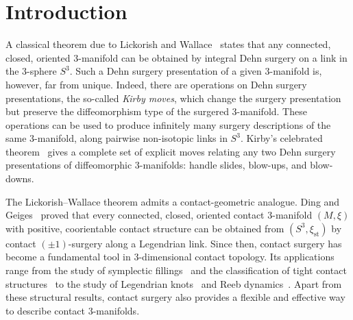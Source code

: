 \documentclass{amsart}
\numberwithin{equation}{section}
\numberwithin{figure}{section}
\theoremstyle{definition}
\theoremstyle{remark}
\let\olddxi\xi %
\renewcommand{\xi}{\olddxi}
\newcommand{\xist}{\olddxi_{\mathrm{st}}}
\begin{document}
\section{Introduction}
A classical theorem due to Lickorish and Wallace~\cite{Lickorish,Wallace} states that any connected, closed, oriented $3$-manifold can be obtained by integral Dehn surgery on a link in the $3$-sphere $S^3$. Such a Dehn surgery presentation of a given \(3\)-manifold is, however, far from unique. Indeed, there are operations on Dehn surgery presentations, the so-called \emph{Kirby moves}, which change the surgery presentation but preserve the diffeomorphism type of the surgered \(3\)-manifold. These operations can be used to produce infinitely many surgery descriptions of the same \(3\)-manifold, along pairwise non-isotopic links in \(S^3\). Kirby's celebrated theorem~\cite{Kirby} gives a complete set of explicit moves relating any two Dehn surgery presentations of diffeomorphic $3$-manifolds: handle slides, blow-ups, and blow-downs.

The Lickorish--Wallace theorem admits a contact-geometric analogue. Ding and Geiges~\cite{Ding_Geiges} proved that every connected, closed, oriented contact $3$-manifold $(M,\xi)$ with positive, coorientable contact structure can be obtained from $(S^3,\xist)$ by contact $(\pm1)$-surgery along a Legendrian link. Since then, contact surgery has become a fundamental tool in $3$-dimensional contact topology. Its applications range from the study of symplectic fillings~\cite{Eliashberg_handle,Weinstein,Gompf,Gompf_Stipsicz,Ozbagci_Stipsicz} and the classification of tight contact structures~\cite{Honda_classification,Lisac_StipsiczI,Lisac_StipsiczII,Lisac_StipsiczIII,Wand} to the study of Legendrian knots~\cite{Geiges_Onaran} and Reeb dynamics~\cite{BEE,Avdek_surgery}. Apart from these structural results, contact surgery also provides a flexible and effective way to describe contact $3$-manifolds.
\end{document}
